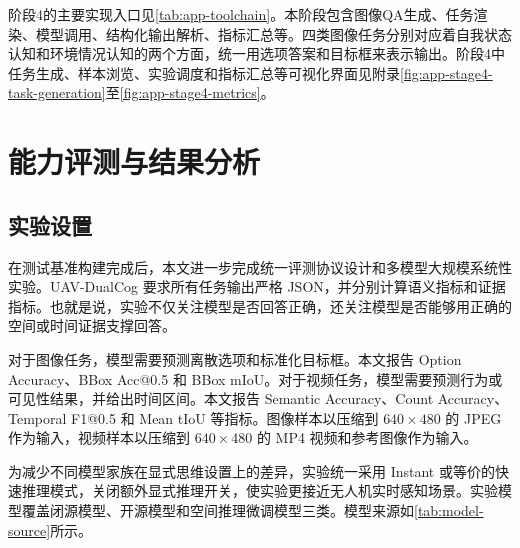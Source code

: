 阶段4的主要实现入口见\autoref{tab:app-toolchain}。本阶段包含图像QA生成、任务渲染、模型调用、结构化输出解析、指标汇总等。四类图像任务分别对应着自我状态认知和环境情况认知的两个方面，统一用选项答案和目标框来表示输出。阶段4中任务生成、样本浏览、实验调度和指标汇总等可视化界面见附录\autoref{fig:app-stage4-task-generation}至\autoref{fig:app-stage4-metrics}。

\FloatBarrier
\section{能力评测与结果分析}

\subsection{实验设置}

在测试基准构建完成后，本文进一步完成统一评测协议设计和多模型大规模系统性实验。UAV-DualCog 要求所有任务输出严格 JSON，并分别计算语义指标和证据指标。也就是说，实验不仅关注模型是否回答正确，还关注模型是否能够用正确的空间或时间证据支撑回答。

对于图像任务，模型需要预测离散选项和标准化目标框。本文报告 Option Accuracy、BBox Acc@0.5 和 BBox mIoU。对于视频任务，模型需要预测行为或可见性结果，并给出时间区间。本文报告 Semantic Accuracy、Count Accuracy、Temporal F1@0.5 和 Mean tIoU 等指标。图像样本以压缩到 \(640\times480\) 的 JPEG 作为输入，视频样本以压缩到  \(640\times480\) 的 MP4 视频和参考图像作为输入。

为减少不同模型家族在显式思维设置上的差异，实验统一采用 Instant 或等价的快速推理模式，关闭额外显式推理开关，使实验更接近无人机实时感知场景。实验模型覆盖闭源模型、开源模型和空间推理微调模型三类。模型来源如\autoref{tab:model-source}所示。

